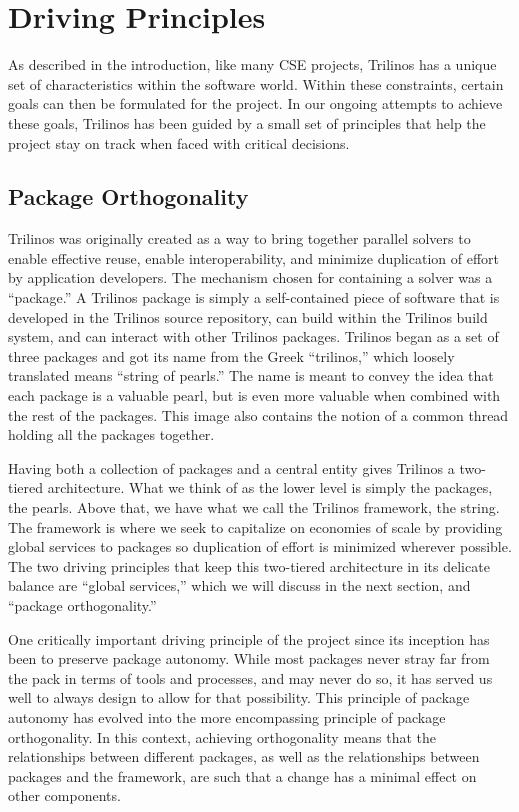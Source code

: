 \documentclass[12pt,relax]{article}
\begin{document}
\section{Driving Principles}
\label{Section:Driving Principles}

As described in the introduction, like many CSE projects, Trilinos has a unique
set of characteristics within the software world.  Within these constraints,
certain goals can then be formulated for the project.  In our ongoing attempts
to achieve these goals, Trilinos has been guided by a small set of principles
that help the project stay on track when faced with critical decisions.

\subsection{Package Orthogonality}

Trilinos was originally created as a way to bring together parallel solvers
to enable effective reuse, enable interoperability, and minimize duplication of
effort by application developers.  The mechanism chosen for containing a solver
was a ``package.''  A Trilinos package is simply a self-contained piece of
software that is developed in the Trilinos source repository, can build within
the Trilinos build system, and can interact with other Trilinos packages.
Trilinos began as a set of three packages and got its name from the Greek 
``trilinos,'' which loosely translated means ``string of pearls.''  The name is
meant to convey the idea that each package is a valuable pearl, but is even
more valuable when combined with the rest of the packages.  This image also
contains the notion of a common thread holding all the packages together.

Having both a collection of packages and a central entity gives Trilinos a
two-tiered architecture.  What we think of as the lower level is simply the
packages, the pearls.  Above that, we have what we call the Trilinos framework,
the string.  The framework is where we seek to capitalize on economies of scale
by providing global services to packages so duplication of effort is minimized
wherever possible.  The two driving principles that keep this two-tiered
architecture in its delicate balance are ``global services,'' which we will
discuss in the next section, and ``package orthogonality.''

One critically important driving principle of the project since its inception
has been to preserve package autonomy.  While most packages never stray far
from the pack in terms of tools and processes, and may never do so, it has
served us well to always design to allow for that possibility.  This principle
of package autonomy has evolved into the more encompassing principle of package
orthogonality.  In this context, achieving orthogonality means that the 
relationships between different packages, as well as the relationships between
packages and the framework, are such that a change has a minimal effect on
other components.
\end{document}
